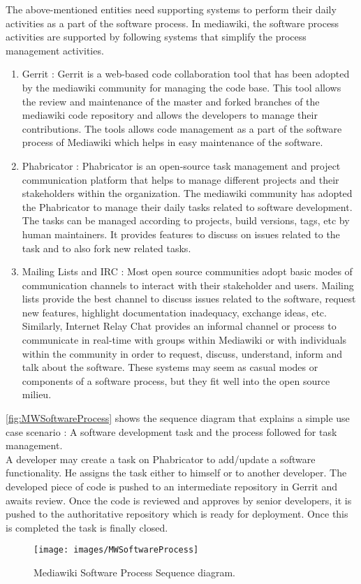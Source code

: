 \indent The above-mentioned entities need supporting systems to perform their daily activities as a part of the software process. In mediawiki, the software process activities are supported by following systems that simplify the process management  activities. 
\begin{enumerate}
\item Gerrit : Gerrit \cite{gerrit} is a web-based code collaboration tool that has been adopted by the mediawiki community for managing the code base. This tool allows the review and maintenance of the master and forked branches of the mediawiki code repository and allows the developers to manage their contributions. The tools allows code management as a part of the software process of Mediawiki which helps in easy maintenance of the software. 
\item Phabricator : Phabricator \cite{phab} is an open-source task management and project communication platform that helps to manage different projects and their stakeholders within the organization. The mediawiki community has adopted the Phabricator to manage their daily tasks related to software development. The tasks can be managed according to projects, build versions, tags, etc by human maintainers. It provides features to discuss on issues related to the task and to also fork new related tasks.
\item Mailing Lists and IRC : Most open source communities adopt basic modes of communication channels to interact with their stakeholder and users. Mailing lists provide the best channel to discuss issues related to the software, request new features, highlight documentation inadequacy, exchange ideas, etc. Similarly, Internet Relay Chat \cite{irc} provides an informal channel or process to communicate in real-time with groups within Mediawiki or with individuals within the community in order to request, discuss, understand, inform and talk about the software. 
\newline These systems may seem as casual modes or components of a software process, but they fit well into the open source milieu.
\end{enumerate}
\indent \autoref{fig:MWSoftwareProcess}  shows the sequence diagram that explains a simple use case scenario : A software development task and the process followed for task management. 
\\\indent A developer may create a task on Phabricator to add/update a software functionality. He assigns the task either to himself or to another developer. The developed piece of code is pushed to an intermediate repository in Gerrit and awaits review. Once the code is reviewed and approves by senior developers, it is pushed to the authoritative repository which is ready for deployment. Once this is completed the task is finally closed.  
\begin{figure}[H]
  \centering
  \texttt{[image: images/MWSoftwareProcess]}
  \caption[Current software maintenace process Sequence diagram]{Mediawiki Software Process Sequence diagram.}\label{fig:MWSoftwareProcess}
\end{figure}
